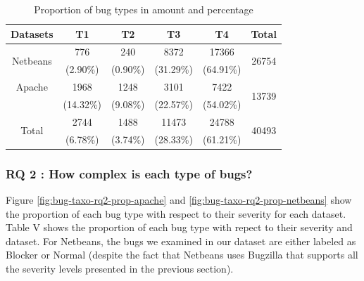 \begin{table}[h!]
\centering

\begin{tabular}{c|c|c|c|c|c}
Datasets                  & T1        & T2       & T3        & T4        & Total                  \\ \hline \hline
\multirow{2}{*}{Netbeans} & 776       & 240      & 8372      & 17366     & \multirow{2}{*}{26754} \\
                          & (2.90\%)  & (0.90\%) & (31.29\%) & (64.91\%) &                        \\ \hline
Apache                    & 1968      & 1248     & 3101      & 7422      & \multirow{2}{*}{13739} \\
                          & (14.32\%) & (9.08\%) & (22.57\%) & (54.02\%) &                        \\ \hline
\multirow{2}{*}{Total}    & 2744      & 1488     & 11473     & 24788     & \multirow{2}{*}{40493} \\
                          & (6.78\%)  & (3.74\%) & (28.33\%) & (61.21\%) & \\ \hline \hline
\end{tabular}
\caption{Proportion of bug types in amount and percentage}
\label{tab:bug-taxo-rq1-prop}
\end{table}


\noindent{}

\subsubsection{RQ 2 : How complex is each type of bugs?}

Figure \ref{fig:bug-taxo-rq2-prop-apache} and \ref{fig:bug-taxo-rq2-prop-netbeans} show the proportion of each bug type with
respect to their severity for each dataset. Table V shows the
proportion of each bug type with repect to their severity and
dataset. For Netbeans, the bugs we examined in our dataset
are either labeled as Blocker or Normal (despite the fact that
Netbeans uses Bugzilla that supports all the severity levels
presented in the previous section).

